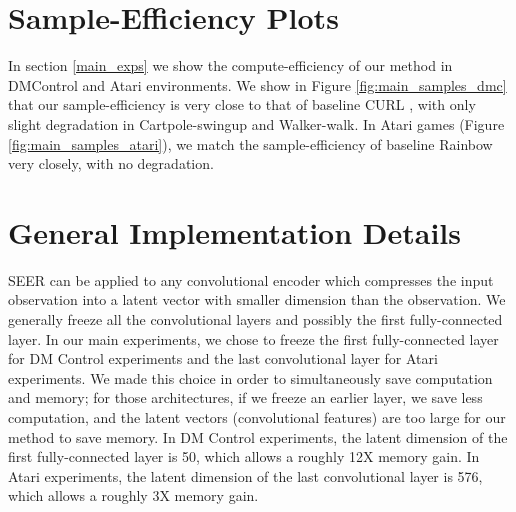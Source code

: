\documentclass{article}
\begin{document}
\section{Sample-Efficiency Plots} \label{appendix:additional_figures2}
In section \ref{main_exps} we show the compute-efficiency of our method in DMControl and Atari environments. We show in Figure \ref{fig:main_samples_dmc} that our sample-efficiency is very close to that of baseline CURL \citep{srinivas2020curl}, with only slight degradation in Cartpole-swingup and Walker-walk. In Atari games (Figure \ref{fig:main_samples_atari}), we match the sample-efficiency of baseline Rainbow \citep{hessel2018rainbow} very closely, with no degradation.

\section{General Implementation Details} \label{appendix:freezing_details}
SEER can be applied to any convolutional encoder which compresses the input observation into a latent vector with smaller dimension than the observation. We generally freeze all the convolutional layers and possibly the first fully-connected layer. In our main experiments, we chose to freeze the first fully-connected layer for DM Control experiments and the last convolutional layer for Atari experiments. We made this choice in order to simultaneously save computation and memory; for those architectures, if we freeze an earlier layer, we save less computation, and the latent vectors (convolutional features) are too large for our method to save memory. In DM Control experiments, the latent dimension of the first fully-connected layer is 50, which allows a roughly 12X memory gain. In Atari experiments, the latent dimension of the last convolutional layer is 576, which allows a roughly 3X memory gain.

\begin{figure*} [t] \centering
{} 
\\
\caption{Comparison of the sample-efficiency of CURL with and without SEER, corresponding to Figure \ref{fig:main_dmc}. The dotted gray line denotes the encoder freezing time . The solid line and shaded regions represent the mean and standard deviation, respectively, across five runs.} \label{fig:main_samples_dmc}
\end{figure*}
\end{document}
